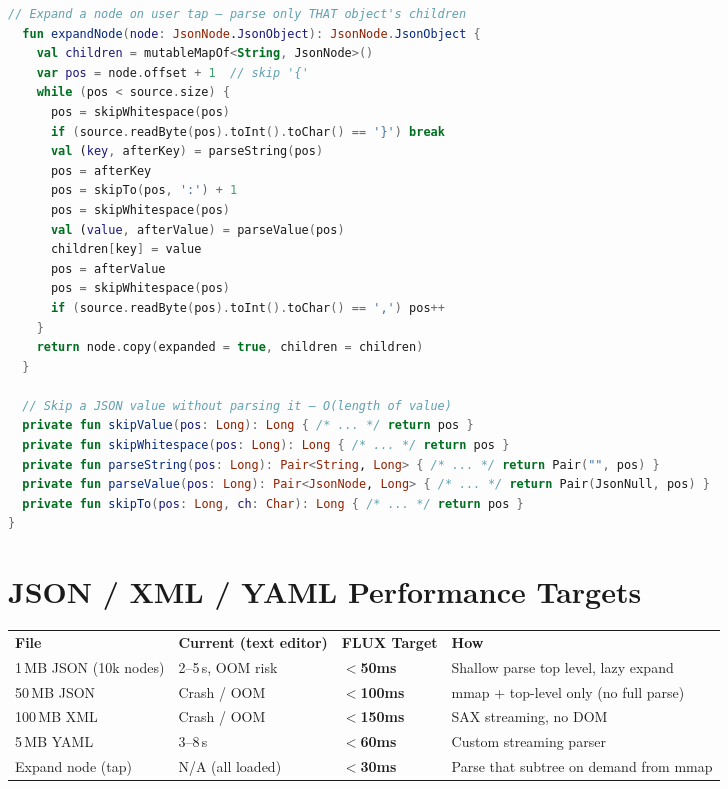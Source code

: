 \documentclass[12pt,a4paper]{report}
\newcommand{\ra}[1]{\renewcommand{\arraystretch}{#1}}
\newcommand{\TH}[1]{\rowcolor{P1}\color{white}\bfseries #1}
\begin{document}
\begin{lstlisting}[language=Kotlin,caption={Streaming JSON tree — lazy expansion}]
  // Expand a node on user tap — parse only THAT object's children
  fun expandNode(node: JsonNode.JsonObject): JsonNode.JsonObject {
    val children = mutableMapOf<String, JsonNode>()
    var pos = node.offset + 1  // skip '{'
    while (pos < source.size) {
      pos = skipWhitespace(pos)
      if (source.readByte(pos).toInt().toChar() == '}') break
      val (key, afterKey) = parseString(pos)
      pos = afterKey
      pos = skipTo(pos, ':') + 1
      pos = skipWhitespace(pos)
      val (value, afterValue) = parseValue(pos)
      children[key] = value
      pos = afterValue
      pos = skipWhitespace(pos)
      if (source.readByte(pos).toInt().toChar() == ',') pos++
    }
    return node.copy(expanded = true, children = children)
  }

  // Skip a JSON value without parsing it — O(length of value)
  private fun skipValue(pos: Long): Long { /* ... */ return pos }
  private fun skipWhitespace(pos: Long): Long { /* ... */ return pos }
  private fun parseString(pos: Long): Pair<String, Long> { /* ... */ return Pair("", pos) }
  private fun parseValue(pos: Long): Pair<JsonNode, Long> { /* ... */ return Pair(JsonNull, pos) }
  private fun skipTo(pos: Long, ch: Char): Long { /* ... */ return pos }
}
\end{lstlisting}

\section{JSON / XML / YAML Performance Targets}

\begin{center}\ra{1.35}
\begin{tabular}{L{3.6cm} C{2.8cm} C{2.0cm} L{5.4cm}}
\TH{File} & \TH{Current (text editor)} & \TH{FLUX Target} & \TH{How} \\
 1\,MB JSON (10k nodes) & 2--5\,s, OOM risk & \textbf{$<$50ms} & Shallow parse top level, lazy expand \\
 50\,MB JSON & Crash / OOM & \textbf{$<$100ms} & mmap + top-level only (no full parse) \\
 100\,MB XML & Crash / OOM & \textbf{$<$150ms} & SAX streaming, no DOM \\
 5\,MB YAML & 3--8\,s & \textbf{$<$60ms} & Custom streaming parser \\
 Expand node (tap) & N/A (all loaded) & \textbf{$<$30ms} & Parse that subtree on demand from mmap \\
\end{tabular}
\end{center}
\end{document}
